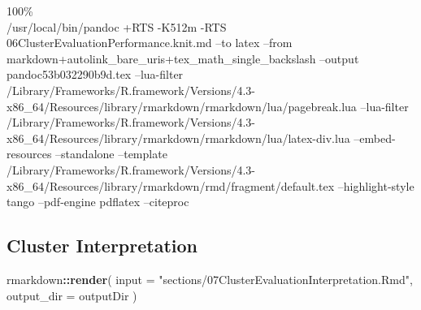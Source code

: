\documentclass[
]{article}
\newenvironment{Shaded}{\begin{snugshade}}{\end{snugshade}}
\newcommand{\AttributeTok}[1]{\textcolor[rgb]{0.13,0.29,0.53}{#1}}
\newcommand{\FunctionTok}[1]{\textcolor[rgb]{0.13,0.29,0.53}{\textbf{#1}}}
\newcommand{\NormalTok}[1]{#1}
\newcommand{\SpecialCharTok}[1]{\textcolor[rgb]{0.81,0.36,0.00}{\textbf{#1}}}
\newcommand{\StringTok}[1]{\textcolor[rgb]{0.31,0.60,0.02}{#1}}
\begin{document}
100\%\\
/usr/local/bin/pandoc +RTS -K512m -RTS
06ClusterEvaluationPerformance.knit.md --to latex --from
markdown+autolink\_bare\_uris+tex\_math\_single\_backslash --output
pandoc53b032290b9d.tex --lua-filter
/Library/Frameworks/R.framework/Versions/4.3-x86\_64/Resources/library/rmarkdown/rmarkdown/lua/pagebreak.lua
--lua-filter
/Library/Frameworks/R.framework/Versions/4.3-x86\_64/Resources/library/rmarkdown/rmarkdown/lua/latex-div.lua
--embed-resources --standalone --template
/Library/Frameworks/R.framework/Versions/4.3-x86\_64/Resources/library/rmarkdown/rmd/fragment/default.tex
--highlight-style tango --pdf-engine pdflatex --citeproc

\hypertarget{cluster-interpretation}{%
\subsection{Cluster Interpretation}\label{cluster-interpretation}}

\begin{Shaded}
\begin{Highlighting}[]
\NormalTok{rmarkdown}\SpecialCharTok{::}\FunctionTok{render}\NormalTok{(}
  \AttributeTok{input =} \StringTok{"sections/07ClusterEvaluationInterpretation.Rmd"}\NormalTok{,}
  \AttributeTok{output\_dir =}\NormalTok{ outputDir}
\NormalTok{)}
\end{Highlighting}
\end{Shaded}
\end{document}

